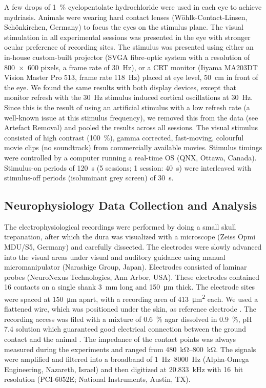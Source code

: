 A few drops of \SI{1}{\percent} cyclopentolate hydrochloride were used in each eye to achieve mydriasis.
Animals were wearing hard contact lenses (W\"ohlk-Contact-Linsen, Sch\"onkirchen, Germany) to focus the eyes on the stimulus plane.
The visual stimulation in all experimental sessions was presented in the eye with stronger ocular preference of recording sites.
The stimulus was presented using either an in-house custom-built projector (SVGA fibre-optic system with a resolution of \num{800x600} pixels, a frame rate of \SI{30}{Hz}), or a \ac{CRT} monitor (Iiyama MA203DT Vision Master Pro 513, frame rate \SI{118}{Hz}) placed at eye level, \SI{50}{\centi\metre} in front of the eye.
We found the same results with both display devices, except that monitor refresh with the \SI{30}{Hz} stimulus induced cortical oscillations at \SI{30}{Hz}.
Since this is the result of using an artificial stimulus with a low refresh rate (a well-known issue at this stimulus frequency), we removed this from the data (see Artefact Removal) and pooled the results across all sessions.
The visual stimulus consisted of high contrast (\SI{100}{\percent}), gamma corrected, fast-moving, colourful movie clips (no soundtrack) from commercially available movies.
Stimulus timings were controlled by a computer running a real-time OS (QNX, Ottawa, Canada).
Stimulus-on periods of \SI{120}{\second} (\num{5} sessions; \num{1} session: \SI{40}{\second}) were interleaved with stimulus-off periods (isoluminant grey screen) of \SI{30}{\second}.


\subsection{Neurophysiology Data Collection and Analysis}

The electrophysiological recordings were performed by doing a small skull trepanation, after which the dura was visualized with a microscope (Zeiss Opmi MDU/S5, Germany) and carefully dissected.
The electrodes were slowly advanced into the visual areas under visual and auditory guidance using manual micromanipulator (Narashige Group, Japan).
Electrodes consisted of laminar probes (NeuroNexus Technologies, Ann Arbor, USA).
These electrodes contained \num{16} contacts on a single shank \SI{3}{\milli\metre} long and \SI{150}{\micro\metre} thick.
The electrode sites were spaced at \SI{150}{\micro\metre} apart, with a recording area of \SI{413}{\micro\metre^2} each.
We used a flattened  wire, which was positioned under the skin, as reference electrode \citep{Murayama2010}.
The recording access was filed with a mixture of \SI{0.6}{\percent} agar dissolved in  \SI{0.9}{\percent}, pH 7.4 solution which guaranteed good electrical connection between the ground contact and the animal \citep{Oeltermann2007760}.
The impedance of the contact points was always measured during the experiments and ranged from \SIrange{480}{800}{\kilo\ohm}.
The signals were amplified and filtered into a broadband of \SIrange{1}{8000}{Hz} (Alpha-Omega Engineering, Nazareth, Israel) and then digitized at \SI{20.833}{\kilo\Hz} with \SI{16}{bit} resolution (PCI-6052E; National Instruments, Austin, TX).


